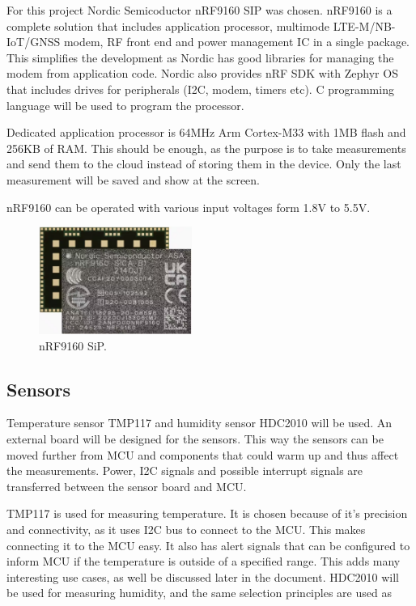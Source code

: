 \documentclass[]{dithesis}
\begin{document}
For this project Nordic Semicoductor nRF9160 SIP was chosen. nRF9160 is a complete solution that includes application processor, multimode LTE-M/NB-IoT/GNSS modem, RF front end and power management IC in a single package. This simplifies the development as Nordic has good libraries for managing the modem from application code. Nordic also provides nRF SDK with Zephyr OS that includes drives for peripherals (I2C, modem, timers etc). C programming language will be used to program the processor.  

Dedicated application processor is 64MHz Arm Cortex-M33 with 1MB flash and 256KB of RAM. This should be enough, as the purpose is to take measurements and send them to the cloud instead of storing them in the device. Only the last measurement will be saved and show at the screen. 

nRF9160 can be operated with various input voltages form 1.8V to 5.5V. 

\begin{figure}[hbt!]
    \centering
    \includegraphics[width=5cm]{nRF9160.jpg}
    \caption{nRF9160 SiP.}
    \label{fig:my_label}
\end{figure}

\newpage

\subsection{Sensors}

Temperature sensor TMP117 and humidity sensor HDC2010 will be used.  An external board will be designed for the sensors. This way the sensors can be moved further from MCU and components that could warm up and thus affect the measurements. Power, I2C signals and possible interrupt signals are transferred between the sensor board and MCU. 

TMP117 is used for measuring temperature. It is chosen because of it's precision and connectivity, as it uses I2C bus to connect to the MCU. This makes connecting it to the MCU easy. It also has alert signals that can be configured to inform MCU if the temperature is outside of a specified range. This adds many interesting use cases, as well be discussed later in the document. HDC2010 will be used for measuring humidity, and the same selection principles are used as 
\end{document}
